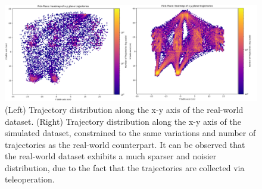 \begin{figure}[t]
    \centering
    \includegraphics[width=1.0\textwidth]{figures/images/ch5/real_world_dataset_coverage.jpg}
    \caption{(Left) Trajectory distribution along the x-y axis of the real-world dataset. (Right) Trajectory distribution along the x-y axis of the simulated dataset, constrained to the same variations and number of trajectories as the real-world counterpart. It can be observed that the real-world dataset exhibits a much sparser and noisier distribution, due to the fact that the trajectories are collected via teleoperation.}
    \label{fig:real_world_coverage}
\end{figure}
